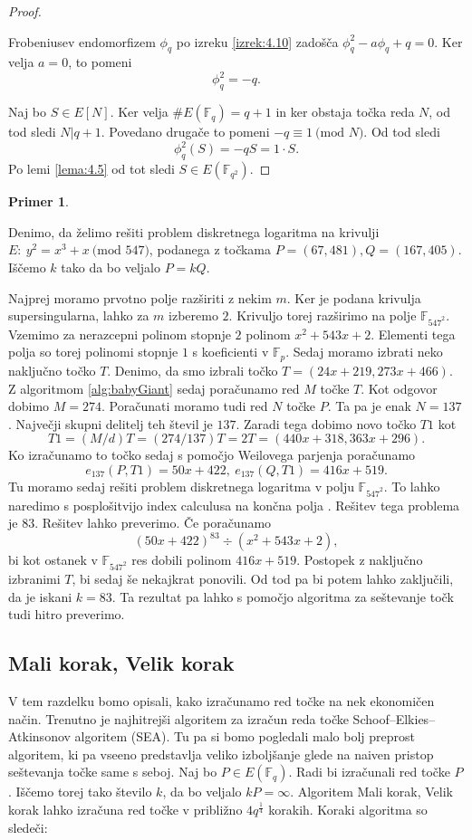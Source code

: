 \documentclass[12pt,a4paper,twoside]{article}
\theoremstyle{definition} %
\newtheorem{primer}[definicija]{Primer}
\theoremstyle{plain} %
\numberwithin{equation}{section}  %
\newcommand{\F}{\mathbb F}
\newcommand{\E}[1]{E({#1})}
\newcommand{\MOD}[1]{\ \text{(mod }{#1}\text{)}}
\begin{document}
\begin{proof}~

 Frobeniusev endomorfizem $\phi_q$ po izreku \ref{izrek:4.10} zadošča $\phi^2_q-a\phi_q+q=0$. Ker velja $a = 0$, to pomeni
$$\phi^2_q = -q.$$

Naj bo $S \in E[N]$. Ker velja $\#\E{\F_q} = q+1$ in ker obstaja točka reda $N$, od tod sledi $N|q+1$. Povedano drugače to pomeni $-q \equiv 1 \MOD{N}$. Od tod sledi
$$\phi^2_q(S) = -qS = 1\cdot S.$$
Po lemi \ref{lema:4.5} od tot sledi $S \in \E{\F_{q^2}}$. 
\end{proof}

\begin{primer}~

Denimo, da želimo rešiti problem diskretnega logaritma na krivulji $E: \ y^2 = x^3+x \MOD{547}$, podanega z točkama $P=(67,481),Q = (167,405)$. Iščemo $k$ tako da bo veljalo $P = kQ$.

Najprej moramo prvotno polje razširiti z nekim $m$. Ker je podana krivulja supersingularna, lahko za $m$ izberemo $2$. Krivuljo torej razširimo na polje $\F_{547^2}$. Vzemimo za nerazcepni polinom stopnje $2$ polinom $x^2+543x+2$. Elementi tega polja so torej polinomi stopnje $1$ s koeficienti v $\F_p$.
Sedaj moramo izbrati neko naključno točko $T$. Denimo, da smo izbrali točko $T = (24x+219,273x+466)$. Z algoritmom \ref{alg:babyGiant} sedaj poračunamo red $M$ točke $T$. Kot odgovor dobimo $M = 274$. Poračunati moramo tudi red $N$ točke $P$. Ta pa je enak $N = 137$. Največji skupni delitelj teh števil je $137$. Zaradi tega dobimo novo točko $T1$ kot 
$$T1 = (M/d) T = (274/137)T = 2T = (440x+318,363x+296).$$
Ko izračunamo to točko sedaj s pomočjo Weilovega parjenja poračunamo
$$e_{137}(P,T1) = 50x+422, \ e_{137}(Q,T1) = 416x+519.$$
Tu moramo sedaj rešiti problem diskretnega logaritma v polju $\F_{547^2}$. To lahko naredimo s posplošitvijo index calculusa na končna polja \cite{Henri2005}. Rešitev tega problema je $83$. Rešitev lahko preverimo.
Če poračunamo
$$(50x+422)^{83} \div (x^2+543x+2),$$
bi kot ostanek v $\F_{547^2}$ res dobili polinom $416x+519$.
Postopek z naključno izbranimi $T$, bi sedaj še nekajkrat ponovili. Od tod pa bi potem lahko zaključili, da je iskani $k=83$. Ta rezultat pa lahko s pomočjo algoritma za seštevanje točk tudi hitro preverimo.
\end{primer}

\subsection{Mali korak, Velik korak}
V tem razdelku bomo opisali, kako izračunamo red točke na nek ekonomičen način. Trenutno je najhitrejši algoritem za izračun reda točke Schoof–Elkies–Atkinsonov algoritem (SEA). Tu pa si bomo pogledali malo bolj preprost algoritem, ki pa vseeno predstavlja veliko izboljšanje glede na naiven pristop seštevanja točke same s seboj.
Naj bo $P \in E(\F_q)$. Radi bi izračunali red točke $P$. Iščemo torej tako število $k$, da bo veljalo $kP = \infty$. Algoritem Mali korak, Velik korak lahko izračuna red točke v približno $4q^{\frac{1}{4}}$ korakih. Koraki algoritma so sledeči:
\end{document}

